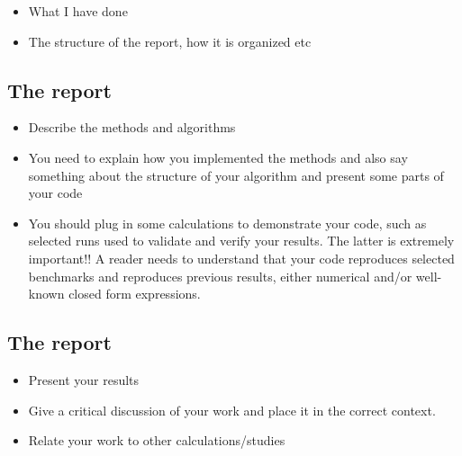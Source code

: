 \documentclass[%
twoside,                 %
final,                   %
10pt]{article}
\newenvironment{block_mdfboxadmon}[1][]{
\begin{block_mdfboxmdframed}[frametitle=#1]
}
{
\end{block_mdfboxmdframed}
}
\begin{document}
{{{{{{{{{\begin{block_mdfboxadmon}
\begin{itemize}
 \item What I have done

 \item The structure of the report, how it is organized etc
\end{itemize}

\noindent
\end{block_mdfboxadmon}




\subsection{The report}

\begin{block_mdfboxadmon}
\begin{itemize}
 \item Describe the methods and algorithms

 \item You need to explain how you implemented the methods and also say something about the structure of your algorithm and present some parts of your code

 \item You should plug in some calculations to demonstrate your code, such as selected runs used to validate and verify your results. The latter is extremely important!!  A reader needs to understand that your code reproduces selected benchmarks and reproduces previous results, either numerical and/or well-known  closed form expressions.
\end{itemize}

\noindent
\end{block_mdfboxadmon}




\subsection{The report}

\begin{block_mdfboxadmon}
\begin{itemize}
 \item Present your results

 \item Give a critical discussion of your work and place it in the correct context.

 \item Relate your work to other calculations/studies


\end{itemize}
\end{block_mdfboxadmon}}}}}}}}}}
\end{document}
